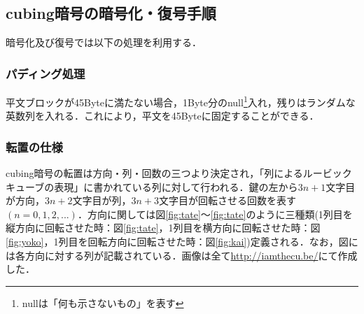 \documentclass[a4j,titlepage]{jsarticle}
\begin{document}
\subsection{cubing暗号の暗号化・復号手順}
暗号化及び復号では以下の処理を利用する．

\subsubsection{パディング処理}
平文ブロックが45Byteに満たない場合，1Byte分のnull\footnote{nullは「何も示さないもの」を表す}入れ，残りはランダムな英数列を入れる．これにより，平文を45Byteに固定することができる．

\subsubsection{転置の仕様}
cubing暗号の転置は方向・列・回数の三つより決定され，「列によるルービックキューブの表現」に書かれている列に対して行われる．鍵の左から\(3n+1\)文字目が方向，\(3n+2\)文字目が列，\(3n+3\)文字目が回転させる回数を表す\((n=0,1,2,...)\)．方向に関しては図\ref{fig:tate}〜\ref{fig:tate}のように三種類(1列目を縦方向に回転させた時：図\ref{fig:tate}，1列目を横方向に回転させた時：図\ref{fig:yoko}，1列目を回転方向に回転させた時：図\ref{fig:kai})定義される．なお，図には各方向に対する列が記載されている．画像は全て\url{http://iamthecu.be/}にて作成した．
\end{document}
